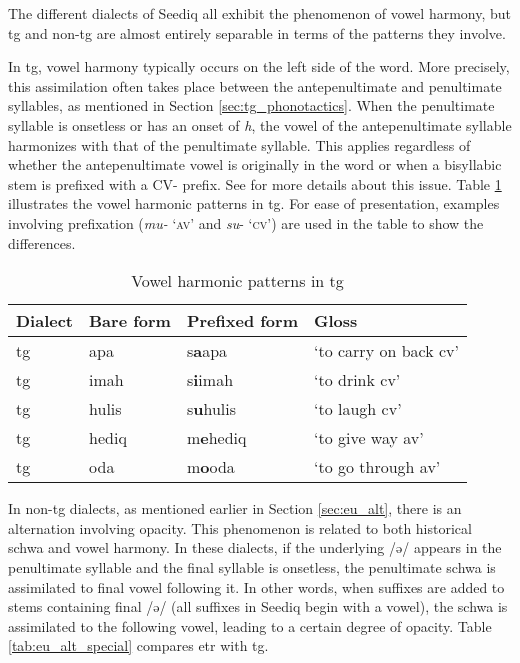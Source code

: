 The different dialects of Seediq all exhibit the phenomenon of vowel harmony, but \acl{tg} and non-\acl{tg} are almost entirely separable in terms of the patterns they involve. 

In \acl{tg}, vowel harmony typically occurs on the left side of the word. More precisely, this assimilation often takes place between the antepenultimate and penultimate syllables, as mentioned in Section \ref{sec:tg_phonotactics}. When the penultimate syllable is onsetless or has an onset of \textit{h}, the vowel of the antepenultimate syllable harmonizes with that of the penultimate syllable. This applies regardless of whether the antepenultimate vowel is originally in the word or when a bisyllabic stem is prefixed with a CV- prefix. See \textcite[666-673]{yang1976sedpho} for more details about this issue. Table \ref{tab:tg_vhar} illustrates the vowel harmonic patterns in \acl{tg}. For ease of presentation, examples involving prefixation (\textit{mu-} `\textsc{av}' and \textit{su}- `\textsc{cv}') are used in the table to show the differences.

\begin{table}[!htbp]
\centering
\caption{Vowel harmonic patterns in \acl{tg}}
\label{tab:tg_vhar}
\begin{tabular}{llll}
\hline
Dialect  & Bare form & Prefixed form & Gloss                       \\ \hline
\acl{tg} & apa       & s\textbf{a}apa         & `to carry on back \acs{cv}' \\
\acl{tg} & imah      & s\textbf{i}imah        & `to drink \acs{cv}'         \\
\acl{tg} & hulis     & s\textbf{u}hulis       & `to laugh \acs{cv}'         \\
\acl{tg} & hediq     & m\textbf{e}hediq       & `to give way \acs{av}'      \\
\acl{tg} & oda       & m\textbf{o}oda         & `to go through \acs{av}'          \\ \hline
\end{tabular}
\end{table}

In non-\acl{tg} dialects, as mentioned earlier in Section \ref{sec:eu_alt}, there is an alternation involving opacity. This phenomenon is related to both historical schwa and vowel harmony. In these dialects, if the underlying /ə/ appears in the penultimate syllable and the final syllable is onsetless, the penultimate schwa is assimilated to final vowel following it. In other words, when suffixes are added to stems containing final /ə/ (all suffixes in Seediq begin with a vowel), the schwa is assimilated to the following vowel, leading to a certain degree of opacity. Table \ref{tab:eu_alt_special} compares \acl{etr} with \acl{tg}.


